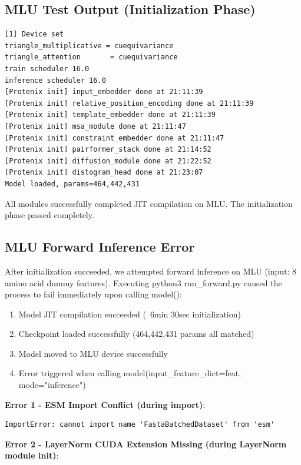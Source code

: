 \documentclass[12pt,a4paper]{article}
\begin{document}
\subsection{MLU Test Output (Initialization Phase)}

\begin{verbatim}
[1] Device set
triangle_multiplicative = cuequivariance
triangle_attention       = cuequivariance
train scheduler 16.0
inference scheduler 16.0
[Protenix init] input_embedder done at 21:11:39
[Protenix init] relative_position_encoding done at 21:11:39
[Protenix init] template_embedder done at 21:11:39
[Protenix init] msa_module done at 21:11:47
[Protenix init] constraint_embedder done at 21:11:47
[Protenix init] pairformer_stack done at 21:14:52
[Protenix init] diffusion_module done at 21:22:52
[Protenix init] distogram_head done at 21:23:07
Model loaded, params=464,442,431
\end{verbatim}

All modules successfully completed JIT compilation on MLU. The initialization phase passed completely.

\subsection{MLU Forward Inference Error}

After initialization succeeded, we attempted forward inference on MLU (input: 8 amino acid dummy features). Executing python3 run_forward.py caused the process to fail immediately upon calling model():

\begin{enumerate}
    \item Model JIT compilation succeeded (~6min 30sec initialization)
    \item Checkpoint loaded successfully (464,442,431 params all matched)
    \item Model moved to MLU device successfully
    \item Error triggered when calling model(input_feature_dict=feat, mode="inference")
\end{enumerate}

\textbf{Error 1 - ESM Import Conflict (during import)}:

\begin{verbatim}
ImportError: cannot import name 'FastaBatchedDataset' from 'esm'
\end{verbatim}

\textbf{Error 2 - LayerNorm CUDA Extension Missing (during LayerNorm module init)}:
\end{document}
